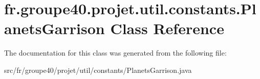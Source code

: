 \hypertarget{classfr_1_1groupe40_1_1projet_1_1util_1_1constants_1_1_planets_garrison}{}\section{fr.\+groupe40.\+projet.\+util.\+constants.\+Planets\+Garrison Class Reference}
\label{classfr_1_1groupe40_1_1projet_1_1util_1_1constants_1_1_planets_garrison}


The documentation for this class was generated from the following file\+:\begin{DoxyCompactItemize}
\item 
src/fr/groupe40/projet/util/constants/Planets\+Garrison.\+java\end{DoxyCompactItemize}
